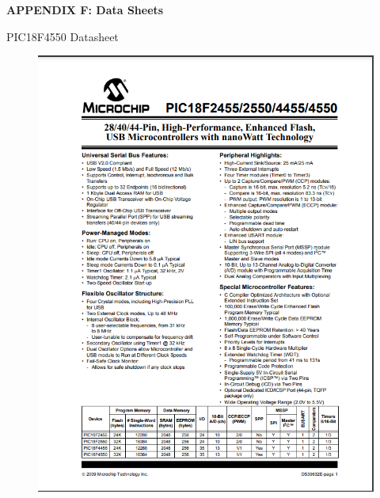 \documentclass[a4paper,12pt]{article}
\begin{document}
\newpage
\thispagestyle{empty}
\vspace*{0.25\textheight}
\begin{center}
\LARGE\textbf{APPENDIX F:  Data Sheets}
\end{center}

\newpage
 PIC18F4550 Datasheet
\begin{figure}[!h]
\centering
\includegraphics[scale=1.2]{pic18datasheet.png}\\
\end{figure}
\end{document}
